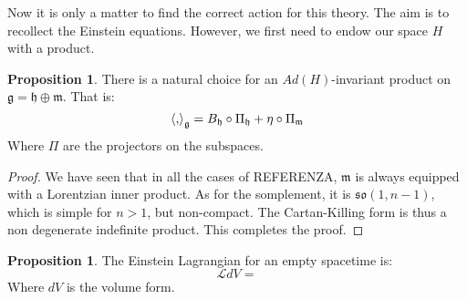 \documentclass[12pt,a4paper]{report}
\theoremstyle{definition}
\theoremstyle{Theorem}
\newtheorem{Prop}[Def]{Proposition}
\theoremstyle{definition}
\theoremstyle{definition}
\begin{document}
	Now it is only a matter to find the correct action for this theory. The aim is to recollect the Einstein equations. However, we first need to endow our space $H$ with a product.
	\begin{Prop}
		There is a natural choice for an $Ad(H)$-invariant product on $\mathfrak{g}=\mathfrak{h}\oplus\mathfrak{m}$. That is:
		$$\braket{,}_\mathfrak{g}=B_\mathfrak{h}\circ\Pi_\mathfrak{h}+\eta\circ\Pi_\mathfrak{m}$$
		Where $\Pi$ are the projectors on the subspaces.
	\end{Prop}
	\begin{proof}
		We have seen that in all the cases of REFERENZA, $\mathfrak{m}$ is always equipped with a Lorentzian inner product. As for the somplement, it is $\mathfrak{so}(1,n-1)$, which is simple for $n>1$, but non-compact. The Cartan-Killing form is thus a non degenerate indefinite product. This completes the proof.
	\end{proof}
	\begin{Prop}
		The Einstein Lagrangian for an empty spacetime is:
		$$\mathcal{L}dV=$$
		Where $dV$ is the volume form.
	\end{Prop}
\end{document}
